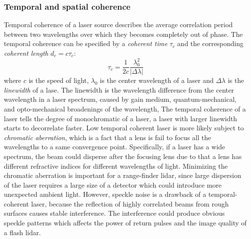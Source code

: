 \subsubsection{Temporal and spatial coherence}
Temporal coherence of a laser source describes the average correlation period between two wavelengths over which they becomes completely out of phase. The temporal coherence can be specified by a \emph{coherent time} $\tau_c$ and the corresponding \emph{coherent length} $d_c=c\tau_c$:
\begin{equation}
\tau_c = \frac{1}{2c}\frac{\lambda_0^2}{|\Delta\lambda|}    
\end{equation}
where $c$ is the speed of light, $\lambda_0$ is the center wavelength of a laser and $\Delta\lambda$ is the \emph{linewidth} of a lase. The linewidth is the wavelength difference from the center wavelength in a laser spectrum, caused by gain medium, quantum-mechanical, and opto-mechanical broadenings of the wavelength, \etc The temporal coherence of a laser tells the degree of monochromatic of a laser, \ie a laser with larger linewidth starts to decorrelate faster. Low temporal coherent laser is more likely subject to \emph{chromatic aberration}, which is a fact that a lens is fail to focus all the wavelengths to a same convergence point. Specifically, if a laser has a wide spectrum, the beam could disperse after the focusing lens due to that a lens has different refractive indices for different wavelengths of light. Minimizing the chromatic aberration is important for a range-finder lidar, since large dispersion of the laser requires a large size of a detector which could introduce more unexpected ambient light. However, speckle noise is a drawback of a temporal-coherent laser, because the reflection of highly correlated beams from rough surfaces causes stable interference. The interference could produce obvious speckle patterns which affects the power of return pulses and the image quality of a flash lidar.\\
